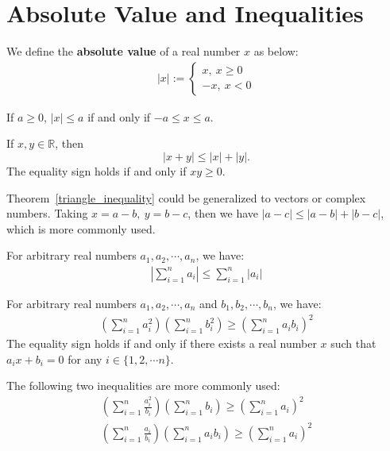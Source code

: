 	\section{Absolute Value and Inequalities}
	\begin{definitionenv}
		We define the \textbf{absolute value} of a real number $x$ as below:
		\begin{align*}
			|x|:=\begin{cases}x,\ x\ge0
				\\ -x,\ x<0
			\end{cases}
		\end{align*}
	\end{definitionenv}
	\begin{theoremenv}
		If $a\ge 0$, $|x|\le a$ if and only if $-a\le x \le a$.
	\end{theoremenv}
	\begin{theoremenv}\label{triangle_inequality}
		If $x,y\in \mathbb{R}$, then $$|x+y| \le |x|+|y|.$$ The equality sign holds if and only if $xy\ge 0$.
	\end{theoremenv}
	\begin{remarkenv}
		Theorem~\ref{triangle_inequality} could be generalized to vectors or complex numbers. Taking $x=a-b,\ y=b-c$, then we have $|a-c|\le |a-b|+|b-c|$, which is more commonly used.
	\end{remarkenv}
	\begin{theoremenv}
		For arbitrary real numbers $a_1,a_2,\cdots,a_n$, we have:
		\begin{align*}
			\left|\sum_{i=1}^n a_i\right|\le \sum_{i=1}^n |a_i|
		\end{align*}
	\end{theoremenv}
	\begin{theoremenv}\label{cauchy_schwarz_inequality}
		For arbitrary real numbers $a_1,a_2,\cdots,a_n$ and $b_1,b_2,\cdots,b_n$, we have:
		\begin{align*}
			\left(\sum_{i=1}^{n}a_i^2\right)\left(\sum_{i=1}^{n}b_i^2\right) \ge \left(\sum_{i=1}^{n}a_ib_i\right)^2
		\end{align*}
		The equality sign holds if and only if there exists a real number $x$ such that $a_ix+b_i=0$ for any $i\in \{1,2,\cdots n\}$.
	\end{theoremenv}
	\begin{remarkenv}
		The following two inequalities are more commonly used:
		\begin{align*}
			\left(\sum_{i=1}^{n}\frac{a_i^2}{b_i}\right)\left(\sum_{i=1}^{n}b_i\right) \ge \left(\sum_{i=1}^{n}a_i\right)^2\\
			\left(\sum_{i=1}^{n}\frac{a_i}{b_i}\right)\left(\sum_{i=1}^{n}a_ib_i\right) \ge \left(\sum_{i=1}^{n}a_i\right)^2
		\end{align*}
	\end{remarkenv}
	\newpage